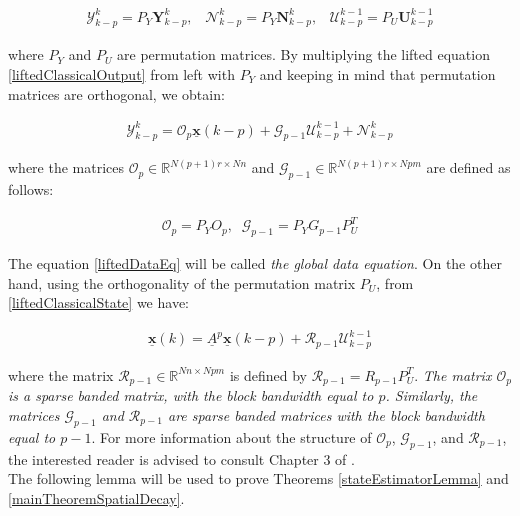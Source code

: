 \documentclass[journal,10pt]{IEEEtran}
\begin{document}
\begin{small}
\begin{align}
\mathcal{Y}_{k-p}^{k}=P_{Y}\mathbf{Y}_{k-p}^{k},\;\;\;\mathcal{N}_{k-p}^{k}=P_{Y}\mathbf{N}_{k-p}^{k},\;\;\; \mathcal{U}_{k-p}^{k-1}=P_{U}\mathbf{U}_{k-p}^{k-1}
\label{permutationMatrices}
\end{align}
\end{small}
where $P_{Y}$ and $P_{U}$ are permutation matrices. By multiplying the lifted equation \eqref{liftedClassicalOutput} from left with $P_{Y}$ and keeping in mind that permutation matrices are orthogonal, we obtain:
\begin{small}
\begin{align} 
\mathcal{Y}_{k-p}^{k}=\mathcal{O}_{p}\underline{\mathbf{x}}(k-p)+\mathcal{G}_{p-1}\mathcal{U}_{k-p}^{k-1}+\mathcal{N}_{k-p}^{k}
\label{liftedDataEq}
\end{align}
\end{small}
where the matrices $\mathcal{O}_{p} \in \mathbb{R}^{N(p+1)r\times Nn}$ and $\mathcal{G}_{p-1}\in \mathbb{R}^{N(p+1)r\times Npm}$ are defined as follows:
\begin{small}
\begin{align}
\mathcal{O}_{p}=P_{Y}O_{p},\;\; \mathcal{G}_{p-1}=P_{Y}G_{p-1}P_{U}^{T}
\label{explanationLiftedDataEq}
\end{align}
\end{small}
The equation \eqref{liftedDataEq} will be called \textit{the global data equation}. On the other hand, using the orthogonality of the permutation matrix $P_{U}$, from \eqref{liftedClassicalState} we have:
\begin{small}
\begin{align}
\underline{\mathbf{x}}(k)=\underline{A}^{p}\underline{\mathbf{x}}(k-p)+\mathcal{R}_{p-1}\mathcal{U}_{k-p}^{k-1} \label{liftedState}
\end{align}
\end{small}
where the matrix $\mathcal{R}_{p-1} \in \mathbb{R}^{Nn\times Npm}$ is defined by $\mathcal{R}_{p-1}=R_{p-1}P_{U}^{T}$. \textit{The matrix $\mathcal{O}_{p}$ is a sparse banded matrix, with the block bandwidth equal to $p$. Similarly, the matrices $\mathcal{G}_{p-1}$ and $\mathcal{R}_{p-1}$ are sparse banded matrices with the block bandwidth equal to $p-1$}. For more information about the structure of $\mathcal{O}_{p}$, $\mathcal{G}_{p-1}$, and $\mathcal{R}_{p-1}$, the interested reader is advised to consult Chapter 3 of \cite{haberThesis}.
\\
The following lemma will be used to prove Theorems \ref{stateEstimatorLemma} and \ref{mainTheoremSpatialDecay}. \\
\end{document}
